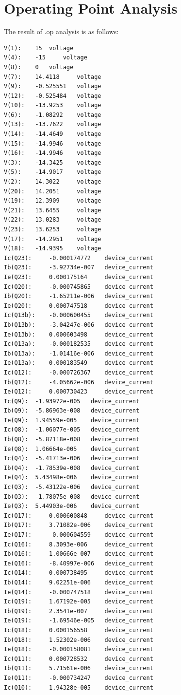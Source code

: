 \documentclass[11pt]{article}
\begin{document}
\section{Operating Point Analysis}
The result of .op analysis is as follows:
\begin{verbatim}
V(1):	 15	 voltage
V(4):	 -15	 voltage
V(8):	 0	 voltage
V(7):	 14.4118	 voltage
V(9):	 -0.525551	 voltage
V(12):	 -0.525484	 voltage
V(10):	 -13.9253	 voltage
V(6):	 -1.08292	 voltage
V(13):	 -13.7622	 voltage
V(14):	 -14.4649	 voltage
V(15):	 -14.9946	 voltage
V(16):	 -14.9946	 voltage
V(3):	 -14.3425	 voltage
V(5):	 -14.9017	 voltage
V(2):	 14.3022	 voltage
V(20):	 14.2051	 voltage
V(19):	 12.3909	 voltage
V(21):	 13.6455	 voltage
V(22):	 13.0283	 voltage
V(23):	 13.6253	 voltage
V(17):	 -14.2951	 voltage
V(18):	 -14.9395	 voltage
Ic(Q23):	 -0.000174772	 device_current
Ib(Q23):	 -3.92734e-007	 device_current
Ie(Q23):	 0.000175164	 device_current
Ic(Q20):	 -0.000745865	 device_current
Ib(Q20):	 -1.65211e-006	 device_current
Ie(Q20):	 0.000747518	 device_current
Ic(Q13b):	 -0.000600455	 device_current
Ib(Q13b):	 -3.04247e-006	 device_current
Ie(Q13b):	 0.000603498	 device_current
Ic(Q13a):	 -0.000182535	 device_current
Ib(Q13a):	 -1.01416e-006	 device_current
Ie(Q13a):	 0.000183549	 device_current
Ic(Q12):	 -0.000726367	 device_current
Ib(Q12):	 -4.05662e-006	 device_current
Ie(Q12):	 0.000730423	 device_current
Ic(Q9):	 -1.93972e-005	 device_current
Ib(Q9):	 -5.86963e-008	 device_current
Ie(Q9):	 1.94559e-005	 device_current
Ic(Q8):	 -1.06077e-005	 device_current
Ib(Q8):	 -5.87118e-008	 device_current
Ie(Q8):	 1.06664e-005	 device_current
Ic(Q4):	 -5.41713e-006	 device_current
Ib(Q4):	 -1.78539e-008	 device_current
Ie(Q4):	 5.43498e-006	 device_current
Ic(Q3):	 -5.43122e-006	 device_current
Ib(Q3):	 -1.78075e-008	 device_current
Ie(Q3):	 5.44903e-006	 device_current
Ic(Q17):	 0.000600848	 device_current
Ib(Q17):	 3.71082e-006	 device_current
Ie(Q17):	 -0.000604559	 device_current
Ic(Q16):	 8.3093e-006	 device_current
Ib(Q16):	 1.00666e-007	 device_current
Ie(Q16):	 -8.40997e-006	 device_current
Ic(Q14):	 0.000738495	 device_current
Ib(Q14):	 9.02251e-006	 device_current
Ie(Q14):	 -0.000747518	 device_current
Ic(Q19):	 1.67192e-005	 device_current
Ib(Q19):	 2.3541e-007	 device_current
Ie(Q19):	 -1.69546e-005	 device_current
Ic(Q18):	 0.000156558	 device_current
Ib(Q18):	 1.52302e-006	 device_current
Ie(Q18):	 -0.000158081	 device_current
Ic(Q11):	 0.000728532	 device_current
Ib(Q11):	 5.71561e-006	 device_current
Ie(Q11):	 -0.000734247	 device_current
Ic(Q10):	 1.94328e-005	 device_current

\end{verbatim}
\end{document}
